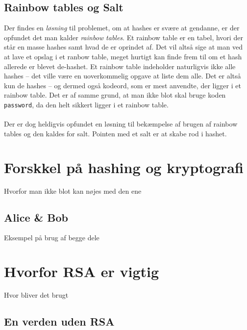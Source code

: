 \documentclass[a4paper, 12pt]{article}
\theoremstyle{break}
\theoremstyle{breakline}
\theoremstyle{beviser}
\begin{document}
    \subsection{Rainbow tables og Salt}
    Der findes en \textit{løsning} til problemet, om at hashes er svære at gendanne, er der opfundet det man kalder \emph{rainbow tables}.
    Et rainbow table er en tabel, hvori der står en masse hashes samt hvad de er oprindet af.
    Det vil altså sige at man ved at lave et opslag i et ranbow table, meget hurtigt kan finde frem til om et hash allerede er blevet de-hashet.
    Et rainbow table indeholder naturligvis ikke alle hashes -- det ville være en uoverkommelig opgave at liste dem alle.
    Det er altså kun de hashes -- og dermed også kodeord, som er mest anvendte, der ligger i et rainbow table.
    Det er af samme grund, at man ikke blot skal bruge koden \texttt{password}, da den helt sikkert ligger i et rainbow table.
    \\
    \\
    Der er dog heldigvis opfundet en løsning til bekæmpelse af brugen af rainbow tables og den kaldes for salt.
    Pointen med et salt er at skabe rod i hashet.







\newpage
\section{Forskkel på hashing og kryptografi}
Hvorfor man ikke blot kan nøjes med den ene

    \subsection{Alice \& Bob}
    Eksempel på brug af begge dele



\newpage
\section{Hvorfor RSA er vigtig}
Hvor bliver det brugt
\cite{dtu}
\cite{au}
\cite{frividen}
\cite{ruc}
\cite{algoritmer}
\cite{absalg,krypto}
    \subsection{En verden uden RSA}



    

\newpage
\setlength\bibitemsep{10pt}
\printbibliography[heading=bibintoc, title={Litteratur}]
\end{document}

